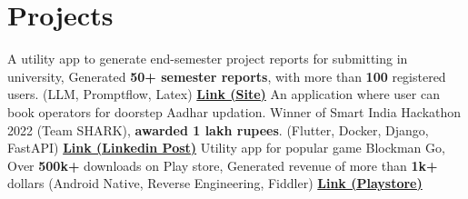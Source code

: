 \section{Projects}
  \resumeSubHeadingListStart
      {A utility app to generate end-semester project reports for submitting in university, Generated \textbf{50+ semester reports}, with more than \textbf{100} registered users. (LLM, Promptflow, Latex) \href{https://tietprojgen.skullzbones.com}{\textbf{Link (Site)}}}
      {An application where user can book operators for doorstep Aadhar updation. Winner of Smart India Hackathon 2022 (Team SHARK), \textbf{awarded 1 lakh rupees}. (Flutter, Docker, Django, FastAPI) \href{https://www.linkedin.com/posts/hsk4link_sih-sih2022-smartindiahackathon-activity-6970324738409672704-YcQA/}{\textbf{Link (Linkedin Post)}}}
      {Utility app for popular game Blockman Go, Over \textbf{500k+} downloads on Play store, Generated revenue of more than \textbf{1k+} dollars (Android Native, Reverse Engineering, Fiddler) \href{https://play.google.com/store/apps/details?id=cf.androefi.xenone}{\textbf{Link (Playstore)}}}

  \resumeSubHeadingListEnd
